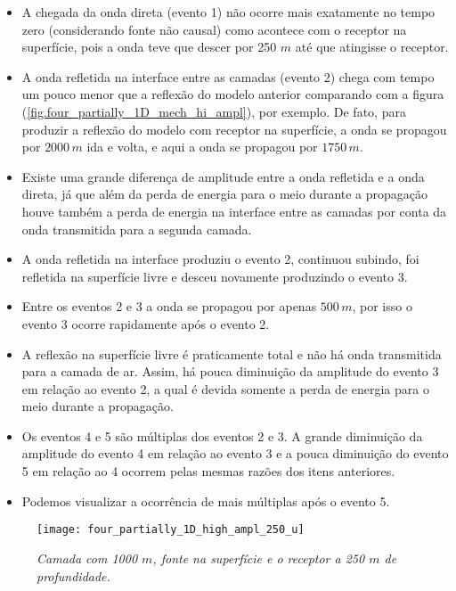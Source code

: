 \begin{itemize}
\item A chegada da onda direta (evento 1) n\~ao ocorre mais exatamente no tempo zero (considerando fonte n\~ao causal) como acontece com o receptor na superf\'icie, pois a onda teve que descer por 250 $m$ at\'e que atingisse o receptor.
\item A onda refletida na interface entre as camadas (evento 2) chega com tempo um pouco menor que a reflex\~ao do modelo anterior comparando com a figura (\ref{fig.four_partially_1D_mech_hi_ampl}), por exemplo. De fato, para produzir a reflex\~ao do modelo com receptor na superf\'icie, a onda se propagou por $2000\,m$ ida e volta, e aqui a onda se propagou por $1750\,m$.
\item Existe uma grande diferen\c{c}a de amplitude entre a onda refletida e a onda direta, j\'a que al\'em da perda de energia para o meio durante a propaga\c{c}\~ao houve tamb\'em a perda de energia na interface entre as camadas por conta da onda transmitida para a segunda camada.
\item A onda refletida na interface produziu o evento 2, continuou subindo, foi refletida na superf\'icie livre e desceu novamente produzindo o evento 3.
\item Entre os eventos 2 e 3 a onda se propagou por apenas $500\,m$, por isso o evento 3 ocorre rapidamente ap\'os o evento 2.
\item A reflex\~ao na superf\'icie livre \'e praticamente total e n\~ao h\'a onda transmitida para a camada de ar. Assim, h\'a pouca diminui\c{c}\~ao da amplitude do evento 3 em rela\c{c}\~ao ao evento 2, a qual \'e devida somente a perda de energia para o meio durante a propaga\c{c}\~ao.
\item Os eventos 4 e 5 s\~ao m\'ultiplas dos eventos 2 e 3. A grande diminui\c{c}\~ao da amplitude do evento 4 em rela\c{c}\~ao ao evento 3 e a pouca diminui\c{c}\~ao do evento 5 em rela\c{c}\~ao ao 4 ocorrem pelas mesmas raz\~oes dos itens anteriores.
\item Podemos visualizar a ocorr\^encia de mais m\'ultiplas ap\'os o evento 5.
\end{itemize}

\begin{figure}
\centering
\texttt{[image: four\_partially\_1D\_high\_ampl\_250\_u]}\\
\caption{\textit{Camada com 1000 $m$, fonte na superf\'icie e o receptor a 250 $m$ de profundidade.}}
\label{fig.four_partially_1D_mech_hi_ampl_250}
\end{figure}

